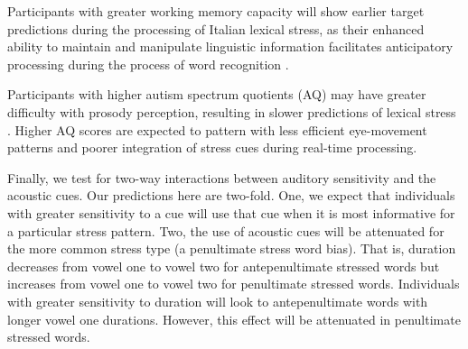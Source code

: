 Participants with greater working memory capacity will show earlier target predictions during the processing of Italian lexical stress, as their enhanced ability to maintain and manipulate linguistic information facilitates anticipatory processing during the process of word recognition \citep{Traxler2009, Huettig2016}.

Participants with higher autism spectrum quotients (AQ) may have greater difficulty with prosody perception, resulting in slower predictions of lexical stress \citep{schelinski2020speech, grossman2023relationship}. Higher AQ scores are expected to pattern with less efficient eye-movement patterns and poorer integration of stress cues during real-time processing.


Finally, we test for two-way interactions between auditory sensitivity and the acoustic cues. Our predictions here are two-fold. One, we expect that individuals with greater sensitivity to a cue will use that cue when it is most informative for a particular stress pattern. Two, the use of acoustic cues will be attenuated for the more common stress type (a penultimate stress word bias). That is, duration decreases from vowel one to vowel two for antepenultimate stressed words but increases from vowel one to vowel two for penultimate stressed words. Individuals with greater sensitivity to duration will look to antepenultimate words with longer vowel one durations. However, this effect will be attenuated in penultimate stressed words.

